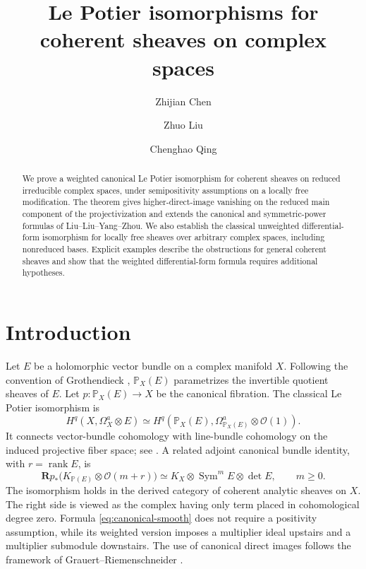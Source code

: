 \documentclass[11pt,reqno]{amsart}
\title[Le Potier isomorphisms on complex spaces]{Le Potier isomorphisms for coherent sheaves on complex spaces}
\date{}
\author{Zhijian Chen}
\author{Zhuo Liu}
\author{Chenghao Qing}
\numberwithin{equation}{section}
\theoremstyle{definition}
\theoremstyle{remark}
\newcommand{\OO}{\mathcal O}
\newcommand{\PP}{\mathbb P}
\newcommand{\RR}{\mathbf R}
\newcommand{\Sym}{\operatorname{Sym}}
\newcommand{\rank}{\operatorname{rank}}
\begin{document}
\begin{abstract}
We prove a weighted canonical Le Potier isomorphism for coherent sheaves on reduced irreducible complex spaces, under semipositivity assumptions on a locally free modification. The theorem gives higher-direct-image vanishing on the reduced main component of the projectivization and extends the canonical and symmetric-power formulas of Liu--Liu--Yang--Zhou. We also establish the classical unweighted differential-form isomorphism for locally free sheaves over arbitrary complex spaces, including nonreduced bases. Explicit examples describe the obstructions for general coherent sheaves and show that the weighted differential-form formula requires additional hypotheses.
\end{abstract}
\maketitle

\section{Introduction}
Let $E$ be a holomorphic vector bundle on a complex manifold $X$. Following the convention of Grothendieck \cite{Grothendieck}, $\PP_X(E)$ parametrizes the invertible quotient sheaves of $E$. Let $p:\PP_X(E)\to X$ be the canonical fibration. The classical Le Potier isomorphism is
\begin{equation}\label{eq:classical}
 H^q(X,\Omega_X^a\otimes E)
 \simeq H^q(\PP_X(E),\Omega_{\PP_X(E)}^a\otimes\OO(1)).
\end{equation}
It connects vector-bundle cohomology with line-bundle cohomology on the induced projective fiber space; see \cite{LePotier}. A related adjoint canonical bundle identity, with $r=\rank E$, is
\begin{equation}\label{eq:canonical-smooth}
 \RR p_*\bigl(K_{\PP(E)}\otimes\OO(m+r)\bigr)
 \simeq K_X\otimes\Sym^m E\otimes\det E,
 \qquad m\geq0.
\end{equation}
The isomorphism holds in the derived category of coherent analytic sheaves on $X$. The right side is viewed as the complex having only term placed in cohomological degree zero. Formula \eqref{eq:canonical-smooth} does not require a positivity assumption, while its weighted version imposes a multiplier ideal upstairs and a multiplier submodule downstairs. The use of canonical direct images follows the framework of Grauert--Riemenschneider \cite{GR}.
\end{document}
